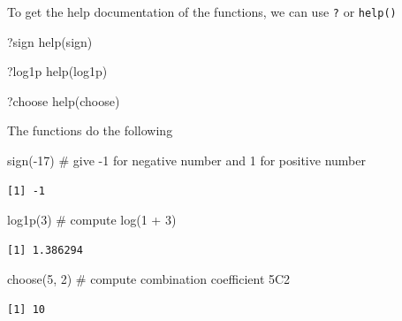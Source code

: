 \documentclass[
  letterpaper,
  DIV=11,
  numbers=noendperiod]{scrreprt}
\newenvironment{Shaded}{\begin{snugshade}}{\end{snugshade}}
\newcommand{\CommentTok}[1]{\textcolor[rgb]{0.37,0.37,0.37}{#1}}
\newcommand{\DecValTok}[1]{\textcolor[rgb]{0.68,0.00,0.00}{#1}}
\newcommand{\FunctionTok}[1]{\textcolor[rgb]{0.28,0.35,0.67}{#1}}
\newcommand{\NormalTok}[1]{\textcolor[rgb]{0.00,0.23,0.31}{#1}}
\newcommand{\SpecialCharTok}[1]{\textcolor[rgb]{0.37,0.37,0.37}{#1}}
\begin{document}
\begin{tcolorbox}[enhanced jigsaw, colbacktitle=quarto-callout-tip-color!10!white, opacitybacktitle=0.6, breakable, left=2mm, leftrule=.75mm, toprule=.15mm, toptitle=1mm, bottomtitle=1mm, colframe=quarto-callout-tip-color-frame, opacityback=0, coltitle=black, arc=.35mm, titlerule=0mm, colback=white, bottomrule=.15mm, title=\textcolor{quarto-callout-tip-color}{\faLightbulb}\hspace{0.5em}{Answer}, rightrule=.15mm]

To get the help documentation of the functions, we can use \texttt{?} or
\texttt{help()}

\begin{Shaded}
\begin{Highlighting}[]
\NormalTok{?sign}
\FunctionTok{help}\NormalTok{(sign)}

\NormalTok{?log1p}
\FunctionTok{help}\NormalTok{(log1p)}

\NormalTok{?choose}
\FunctionTok{help}\NormalTok{(choose)}
\end{Highlighting}
\end{Shaded}

The functions do the following

\begin{Shaded}
\begin{Highlighting}[]
\FunctionTok{sign}\NormalTok{(}\SpecialCharTok{{-}}\DecValTok{17}\NormalTok{)       }\CommentTok{\# give {-}1 for negative number and 1 for positive number}
\end{Highlighting}
\end{Shaded}

\begin{verbatim}
[1] -1
\end{verbatim}

\begin{Shaded}
\begin{Highlighting}[]
\FunctionTok{log1p}\NormalTok{(}\DecValTok{3}\NormalTok{)        }\CommentTok{\# compute log(1 + 3)}
\end{Highlighting}
\end{Shaded}

\begin{verbatim}
[1] 1.386294
\end{verbatim}

\begin{Shaded}
\begin{Highlighting}[]
\FunctionTok{choose}\NormalTok{(}\DecValTok{5}\NormalTok{, }\DecValTok{2}\NormalTok{)    }\CommentTok{\# compute combination coefficient 5C2 }
\end{Highlighting}
\end{Shaded}

\begin{verbatim}
[1] 10
\end{verbatim}

\end{tcolorbox}
\end{document}
